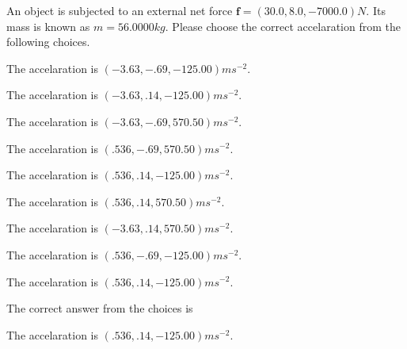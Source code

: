 \documentclass[12pt]{article}
\begin{document}
 
 
An object is subjected to an external net force $\mathbf{f}=
(30.0 , 8.0 , -7000.0) N$.
Its mass is known as $m= %
56.0000 kg$. Please choose the
correct accelaration from the following choices.
 
 
 
The accelaration is $  %
(
-3.63,
-.69,
-125.00)
ms^{-2} $.
 
 
The accelaration is $  %
(
-3.63,
.14,
-125.00)
ms^{-2} $.
 
 
The accelaration is $  %
(
-3.63,
-.69,
570.50)
ms^{-2} $.
 
 
The accelaration is $  %
(
.536,
-.69,
570.50)
ms^{-2} $.
 
 
The accelaration is $  %
(
.536,
.14,
-125.00)
ms^{-2} $.
 
 
The accelaration is $  %
(
.536,
.14,
570.50)
ms^{-2} $.
 
 
The accelaration is $  %
(
-3.63,
.14,
570.50)
ms^{-2} $.
 
 
The accelaration is $  %
(
.536,
-.69,
-125.00)
ms^{-2} $.
 
 
\noindent{}
 
 
The accelaration is $  %
(
.536,
.14,
-125.00)
ms^{-2} $.
 
 
\noindent{}
 
 
 
 
 
\noindent{}
 
 

The correct answer from the choices is


The accelaration is $  %
(
.536,
.14,
-125.00)
ms^{-2} $.
 
 
 
\noindent{}
 
 

 
 
 
\noindent{}
 
\end{document}
